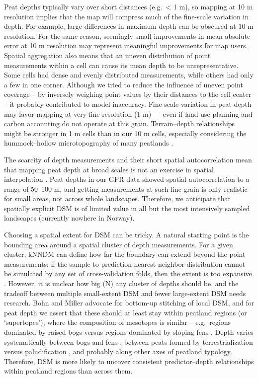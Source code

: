 \documentclass[soil, manuscript]{copernicus}
\begin{document}
Peat depths typically vary over short distances (e.g.~\textless{} 1 m), so mapping at 10 m resolution implies that the map will compress much of the fine-scale variation in depth.
For example, large differences in maximum depth can be obscured at 10 m resolution.
For the same reason, seemingly small improvements in mean absolute error at 10 m resolution may represent meaningful improvements for map users.
Spatial aggregation also means that an uneven distribution of point measurements within a cell can cause its mean depth to be unrepresentative.
Some cells had dense and evenly distributed measurements, while others had only a few in one corner.
Although we tried to reduce the influence of uneven point coverage -- by inversely weighing point values by their distances to the cell center -- it probably contributed to model inaccuracy.
Fine-scale variation in peat depth may favor mapping at very fine resolution (1 m) --- even if land use planning and carbon accounting do not operate at this grain.
Terrain--depth relationships might be stronger in 1 m cells than in our 10 m cells, especially considering the hummock--hollow microtopography of many peatlands \citep{rydin7Mires1999, lindsayPeatbogsCarbonCritical2010}.

The scarcity of depth measurements and their short spatial autocorrelation mean that mapping peat depth at broad scales is not an exercise in spatial interpolation \citep{henglGenericFrameworkSpatial2004}.
Peat depths in our GPR data showed spatial autocorrelation to a range of 50--100 m, and getting measurements at such fine grain is only realistic for small areas, not across whole landscapes.
Therefore, we anticipate that spatially explicit DSM is of limited value in all but the most intensively sampled landscapes (currently nowhere in Norway).

Choosing a spatial extent for DSM can be tricky.
A natural starting point is the bounding area around a spatial cluster of depth measurements.
For a given cluster, kNNDM can define how far the boundary can extend beyond the point measurements; if the sample-to-prediction nearest neighbor distribution cannot be simulated by any set of cross-validation folds, then the extent is too expansive \citep{meyerMachineLearningbasedGlobal2022, linnenbrinkKNNDMCVKfold2024}.
However, it is unclear how big (N) any cluster of depths should be, and the tradeoff between multiple small-extent DSM and fewer large-extent DSM needs research.
Bohn and Miller \citeyearpar{bohnLocallyEnhancedDigital2024} advocate for bottom-up stitching of local DSM, and for peat depth we assert that these should at least stay within peatland regions (or `supertopes'), where the composition of mesotopes is similar -- e.g.~regions dominated by raised bogs versus regions dominated by sloping fens \citep{moenNationalAtlasNorway1999, joostenWiseUseMires2002}.
Depth varies systematically between bogs and fens \citep{lindsayPeatlandMireTypes2016}, between peats formed by terrestrialization versus paludification \citep{buffamFillingHolesRegional2010}, and probably along other axes of peatland typology.
Therefore, DSM is more likely to uncover consistent predictor--depth relationships within peatland regions than across them.
\end{document}
